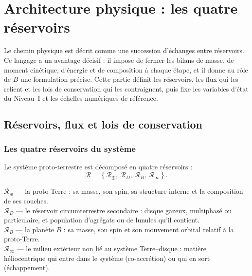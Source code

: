 \documentclass[11pt,a4paper,openany]{report}
\newcommand{\RT}{\mathcal{R}_{\oplus}}
\newcommand{\RD}{\mathcal{R}_{D}}
\newcommand{\RB}{\mathcal{R}_{B}}
\newcommand{\Rinf}{\mathcal{R}_{\infty}}
\begin{document}
\part{Architecture physique : les quatre réservoirs}
\label{part:architecture}

\noindent
Le chemin physique est décrit comme une succession d'échanges entre réservoirs. Ce langage a
un avantage décisif : il impose de fermer les bilans de masse, de moment cinétique, d'énergie et
de composition à chaque étape, et il donne au rôle de $B$ une formulation précise. Cette partie
définit les réservoirs, les flux qui les relient et les lois de conservation qui les contraignent,
puis fixe les variables d'état du Niveau~I et les échelles numériques de référence.

\chapter{Réservoirs, flux et lois de conservation}
\label{ch:reservoirs}

\section{Les quatre réservoirs du système}

Le système proto-terrestre est décomposé en quatre réservoirs :
\begin{equation}
\mathcal{R}=\left\{\RT,\ \RD,\ \RB,\ \Rinf\right\}.
\label{eq:reservoirs}
\end{equation}

\begin{definition}
\textbf{$\RT$} --- la proto-Terre : sa masse, son spin, sa structure interne et la composition de ses
couches.\\
\textbf{$\RD$} --- le réservoir circumterrestre secondaire : disque gazeux, multiphasé ou particulaire,
et population d'agrégats ou de lunules qu'il contient.\\
\textbf{$\RB$} --- la planète $B$ : sa masse, son spin et son mouvement orbital relatif à la
proto-Terre.\\
\textbf{$\Rinf$} --- le milieu extérieur non lié au système Terre--disque : matière héliocentrique
qui entre dans le système (co-accrétion) ou qui en sort (échappement).
\end{definition}
\end{document}
